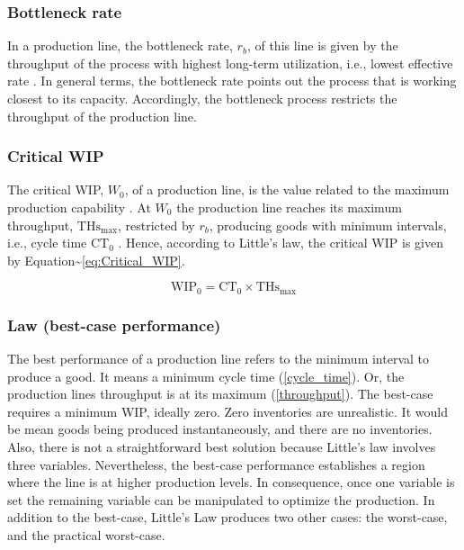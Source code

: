 \documentclass{article}
\begin{document}
\subsubsection{Bottleneck rate}
\label{sec:orgafc56d2}

In a production line, the bottleneck rate, \(r_b\), of this line is given by the throughput of the process with highest long-term utilization, i.e., lowest effective rate \citep{Hopp2001}.
In general terms, the bottleneck rate points out the process that is working closest to its capacity.
Accordingly, the bottleneck process restricts the throughput of the production line.

\subsubsection{Critical WIP}
\label{sec:orgfe22a93}

The critical WIP, \(W_0\), of a production line, is the value related to the maximum production capability \citep{Hopp2001}.
At \(W_0\) the production line reaches its maximum throughput, \(\mbox{THs}_{\mbox{max}}\), restricted by \(r_b\), producing goods with minimum intervals, i.e., cycle time \(\mbox{CT}_0\) \citep{Martin1998}.
Hence, according to Little's law, the critical WIP is given by Equation\textasciitilde{}\ref{eq:Critical_WIP}.

\label{eq:Critical_WIP}
\begin{equation} 
  \mbox{WIP}_0 = \mbox{CT}_0 \times \mbox{THs}_{\mbox{max}}
\end{equation}

\subsubsection{Law (best-case performance)}
\label{sec:orgaefb431}

The best performance of a production line refers to the minimum interval to produce a good.
It means a minimum cycle time (\ref{cycle_time}).
Or, the production lines throughput is at its maximum (\ref{throughput}).
The best-case requires a minimum WIP, ideally zero.
Zero inventories are unrealistic.
It would be mean goods being produced instantaneously, and there are no inventories.
Also, there is not a straightforward best solution because Little's law involves three variables.
Nevertheless, the best-case performance establishes a region where the line is at higher production levels.
In consequence, once one variable is set the remaining variable can be manipulated to optimize the production.
In addition to the best-case, Little's Law produces two other cases: the worst-case, and the practical worst-case.
\end{document}
